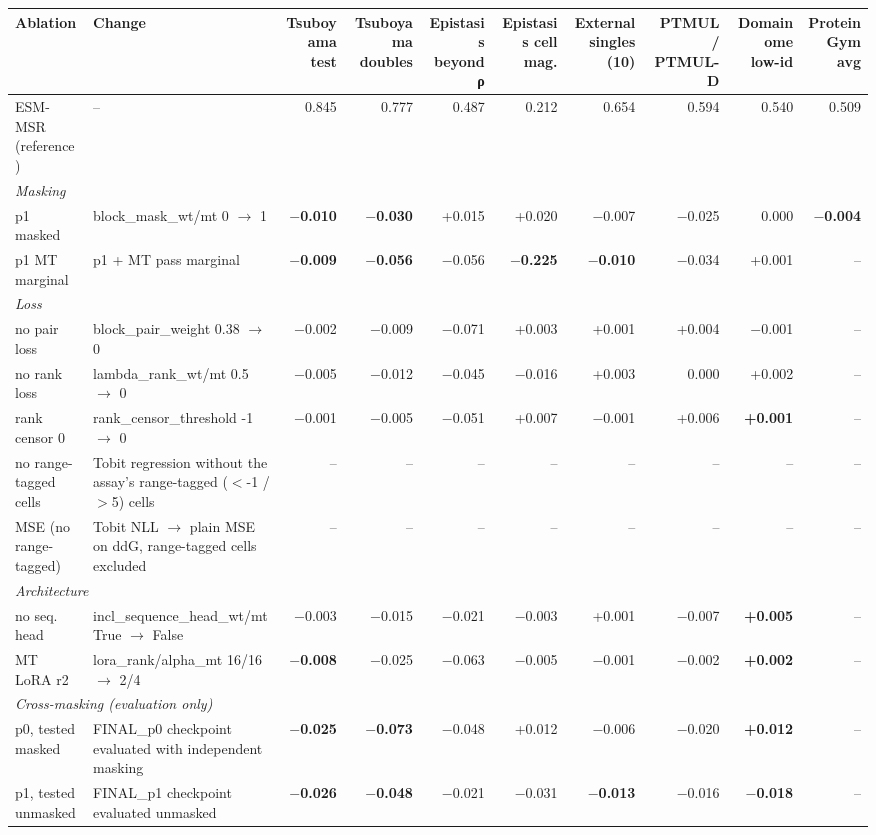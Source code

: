 \begin{tabular}{llrrrrrrrr}
\toprule
Ablation & Change & Tsuboyama test & Tsuboyama doubles & Epistasis beyond ρ & Epistasis cell mag. & External singles (10) & PTMUL / PTMUL-D & Domainome low-id & ProteinGym avg \\
\midrule
ESM-MSR (reference) & -- & 0.845 & 0.777 & 0.487 & 0.212 & 0.654 & 0.594 & 0.540 & 0.509 \\
\midrule
\multicolumn{10}{l}{\textit{Masking}} \\
p1 masked & block\_mask\_wt/mt 0 $\to$ 1 & \textbf{$-$0.010} & \textbf{$-$0.030} & +0.015 & +0.020 & $-$0.007 & $-$0.025 & 0.000 & \textbf{$-$0.004} \\
p1 MT marginal & p1 + MT pass marginal & \textbf{$-$0.009} & \textbf{$-$0.056} & $-$0.056 & \textbf{$-$0.225} & \textbf{$-$0.010} & $-$0.034 & +0.001 & -- \\
\midrule
\multicolumn{10}{l}{\textit{Loss}} \\
no pair loss & block\_pair\_weight 0.38 $\to$ 0 & $-$0.002 & $-$0.009 & $-$0.071 & +0.003 & +0.001 & +0.004 & $-$0.001 & -- \\
no rank loss & lambda\_rank\_wt/mt 0.5 $\to$ 0 & $-$0.005 & $-$0.012 & $-$0.045 & $-$0.016 & +0.003 & 0.000 & +0.002 & -- \\
rank censor 0 & rank\_censor\_threshold -1 $\to$ 0 & $-$0.001 & $-$0.005 & $-$0.051 & +0.007 & $-$0.001 & +0.006 & \textbf{+0.001} & -- \\
no range-tagged cells & Tobit regression without the assay's range-tagged ($<$-1 / $>$5) cells & -- & -- & -- & -- & -- & -- & -- & -- \\
MSE (no range-tagged) & Tobit NLL $\to$ plain MSE on ddG, range-tagged cells excluded & -- & -- & -- & -- & -- & -- & -- & -- \\
\midrule
\multicolumn{10}{l}{\textit{Architecture}} \\
no seq. head & incl\_sequence\_head\_wt/mt True $\to$ False & $-$0.003 & $-$0.015 & $-$0.021 & $-$0.003 & +0.001 & $-$0.007 & \textbf{+0.005} & -- \\
MT LoRA r2 & lora\_rank/alpha\_mt 16/16 $\to$ 2/4 & \textbf{$-$0.008} & $-$0.025 & $-$0.063 & $-$0.005 & $-$0.001 & $-$0.002 & \textbf{+0.002} & -- \\
\midrule
\multicolumn{10}{l}{\textit{Cross-masking (evaluation only)}} \\
p0, tested masked & FINAL\_p0 checkpoint evaluated with independent masking & \textbf{$-$0.025} & \textbf{$-$0.073} & $-$0.048 & +0.012 & $-$0.006 & $-$0.020 & \textbf{+0.012} & -- \\
p1, tested unmasked & FINAL\_p1 checkpoint evaluated unmasked & \textbf{$-$0.026} & \textbf{$-$0.048} & $-$0.021 & $-$0.031 & \textbf{$-$0.013} & $-$0.016 & \textbf{$-$0.018} & -- \\
\bottomrule
\end{tabular}
